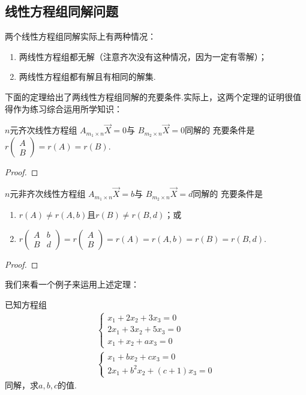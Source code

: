 \subsection{线性方程组同解问题}
两个线性方程组同解实际上有两种情况：
\begin{enumerate}
    \item 两线性方程组都无解（注意齐次没有这种情况，因为一定有零解）；

    \item 两线性方程组都有解且有相同的解集.
\end{enumerate}

下面的定理给出了两线性方程组同解的充要条件.实际上，这两个定理的证明很值得作为练习综合运用所学知识：
\begin{theorem}
    $n$元齐次线性方程组 $A_{m_1 \times n}\vec{X}=0$与 $B_{m_2 \times n}\vec{X}=0$同解的
    充要条件是$r\begin{pmatrix}
        A \\ B
    \end{pmatrix}=r(A)=r(B)$.
\end{theorem}
\begin{proof}
    
\end{proof}

\begin{theorem}
    $n$元非齐次线性方程组 $A_{m_1 \times n}\vec{X}=b$与 $B_{m_2 \times n}\vec{X}=d$同解的
    充要条件是
    \begin{enumerate}
        \item $r(A)\neq r(A,b)$且$r(B)\neq r(B,d)$；或
        \item $r\begin{pmatrix}
            A & b \\ B & d
        \end{pmatrix}=r\begin{pmatrix}
            A \\ B
        \end{pmatrix}=r(A)=r(A,b)=r(B)=r(B,d)$.
    \end{enumerate}
\end{theorem}
\begin{proof}
    
\end{proof}

我们来看一个例子来运用上述定理：
\begin{example}
    已知方程组\begin{gather*}\begin{cases}
            x_1+2x_2+3x_3=0 \\ 2x_1+3x_2+5x_3=0 \\ x_1+x_2+ax_3=0
        \end{cases}
        \\
        \begin{cases}
            x_1+bx_2+cx_3=0 \\ 2x_1+b^2x_2+(c+1)x_3=0
        \end{cases}
    \end{gather*}
    同解，求$a,b,c$的值.
\end{example}
\begin{solution}

\end{solution}

